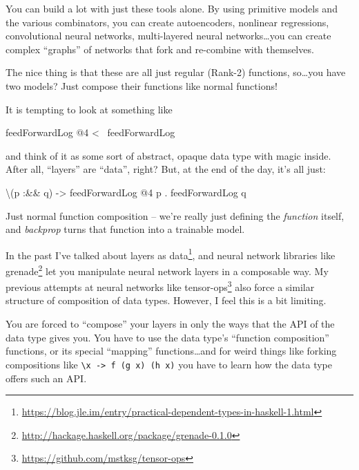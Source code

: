 \documentclass[]{article}
\newenvironment{Shaded}{}{}
\newcommand{\DecValTok}[1]{\textcolor[rgb]{0.25,0.63,0.44}{#1}}
\newcommand{\FunctionTok}[1]{\textcolor[rgb]{0.02,0.16,0.49}{#1}}
\newcommand{\NormalTok}[1]{#1}
\newcommand{\OtherTok}[1]{\textcolor[rgb]{0.00,0.44,0.13}{#1}}
\renewcommand{\href}[2]{#2\footnote{\url{#1}}}
\begin{document}
You can build a lot with just these tools alone. By using primitive models and
the various combinators, you can create autoencoders, nonlinear regressions,
convolutional neural networks, multi-layered neural networks\ldots{}you can
create complex ``graphs'' of networks that fork and re-combine with themselves.

The nice thing is that these are all just regular (Rank-2) functions,
so\ldots{}you have two models? Just compose their functions like normal
functions!

It is tempting to look at something like

\begin{Shaded}
\begin{Highlighting}[]
\NormalTok{feedForwardLog }\FunctionTok{@}\DecValTok{4} \FunctionTok{<~}\NormalTok{ feedForwardLog}
\end{Highlighting}
\end{Shaded}

and think of it as some sort of abstract, opaque data type with magic inside.
After all, ``layers'' are ``data'', right? But, at the end of the day, it's all
just:

\begin{Shaded}
\begin{Highlighting}[]
\NormalTok{\textbackslash{}(p }\FunctionTok{:&&}\NormalTok{ q) }\OtherTok{->}\NormalTok{ feedForwardLog }\FunctionTok{@}\DecValTok{4}\NormalTok{ p }\FunctionTok{.}\NormalTok{ feedForwardLog q}
\end{Highlighting}
\end{Shaded}

Just normal function composition -- we're really just defining the
\emph{function} itself, and \emph{backprop} turns that function into a trainable
model.

In the past I've talked about
\href{https://blog.jle.im/entry/practical-dependent-types-in-haskell-1.html}{layers
as data}, and neural network libraries like
\href{http://hackage.haskell.org/package/grenade-0.1.0}{grenade} let you
manipulate neural network layers in a composable way. My previous attempts at
neural networks like \href{https://github.com/mstksg/tensor-ops}{tensor-ops}
also force a similar structure of composition of data types. However, I feel
this is a bit limiting.

You are forced to ``compose'' your layers in only the ways that the API of the
data type gives you. You have to use the data type's ``function composition''
functions, or its special ``mapping'' functions\ldots{}and for weird things like
forking compositions like
\texttt{\textbackslash{}x\ -\textgreater{}\ f\ (g\ x)\ (h\ x)} you have to learn
how the data type offers such an API.
\end{document}
